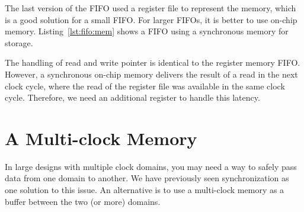 \documentclass[%
    10pt,
    headinclude, footexclude,
    openright, %
    notitlepage,
    cleardoubleempty,
    headsepline,
    pointlessnumbers,
    bibtotoc, idxtotoc,
    ]{scrbook}
\newcommand{\code}[1]{{\lstinline[basicstyle=\small\ttfamily]{#1}}}
\newcommand{\todo}[1]{{\emph{TODO: #1}}}
\renewcommand{\todo}[1]{}
\begin{document}
The last version of the FIFO used a register file to represent the memory,
which is a good solution for a small FIFO. For larger FIFOs, it is better to
use on-chip memory.
Listing~\ref{lst:fifo:mem} shows a FIFO using a synchronous memory for
storage.

\newpage
{}

The handling of read and write pointer is identical to the register memory
FIFO. However, a synchronous on-chip memory delivers the result of a read
in the next clock cycle, where the read of the register file was available in the
same clock cycle.
Therefore, we need an additional register to handle this latency.

\todo{Maybe redo the FIFO again as described below (in the comment).}

\todo{
The memory based FIFO can efficiently hold larger amounts of data in the queue
and has a short fall through latency. In the last design, the output of the FIFO may
come directly from the memory read. If this data path is in the critical path of the design,
we can easily pipeline our design by combining two FIFOs. Listing~\ref{lst:fifo:comb}
shows such a combination. On the output of the memory based FIFO we add a single
stage double buffer FIFO to decouple the memory read path from the output.}


\section{A Multi-clock Memory}

In large designs with multiple clock domains, you may need a way to safely
pass data from one domain to another. We have previously seen synchronization as
one solution to this issue. An alternative is to use a multi-clock memory as
a buffer between the two (or more) domains.
\end{document}

